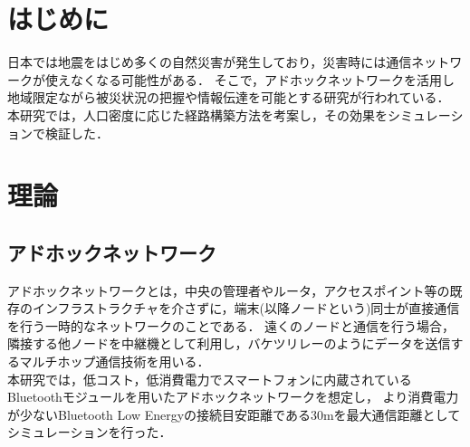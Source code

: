 \documentclass[a4paper, 9pt]{ltjsarticle}
\begin{document}
\setlength{\columnsep}{7.5mm}

\twocolumn[
    \begin{center}
        {\vspace{-1em}}

        {\fontsize{15pt}{15pt}\selectfont{災害時を想定したアドホックネットワーク構築手法の検討}}

        {\vspace{1.5em}}

        {\fontsize{13pt}{13pt}\selectfont{Study of Construction Methods for Ad-Hoc Network under Disaster}}
    \end{center}



    \begin{flushright}
      {\fontsize{11pt}{11pt}\selectfont{T5-17　末廣隼人\\}}
      {\fontsize{11pt}{11pt}\selectfont{指導教員　髙﨑和之}}
    \end{flushright}

    \vspace{1em}

    \thispagestyle{empty}
]

\section{はじめに} \label{label:first}
日本では地震をはじめ多くの自然災害が発生しており，災害時には通信ネットワークが使えなくなる可能性がある．
そこで，アドホックネットワークを活用し地域限定ながら被災状況の把握や情報伝達を可能とする研究が行われている．
本研究では，人口密度に応じた経路構築方法を考案し，その効果をシミュレーションで検証した．%

\section{理論} \label{label:theory}
\subsection{アドホックネットワーク} \label{sublabel:about ad-hoc network}
アドホックネットワークとは，中央の管理者やルータ，アクセスポイント等の既存のインフラストラクチャを介さずに，端末(以降ノードという)同士が直接通信を行う一時的なネットワークのことである．
遠くのノードと通信を行う場合，隣接する他ノードを中継機として利用し，バケツリレーのようにデータを送信するマルチホップ通信技術を用いる．%
\\ \indent 本研究では，低コスト，低消費電力でスマートフォンに内蔵されているBluetoothモジュールを用いたアドホックネットワークを想定し，
より消費電力が少ないBluetooth Low Energyの接続目安距離である30mを最大通信距離としてシミュレーションを行った．
\end{document}
